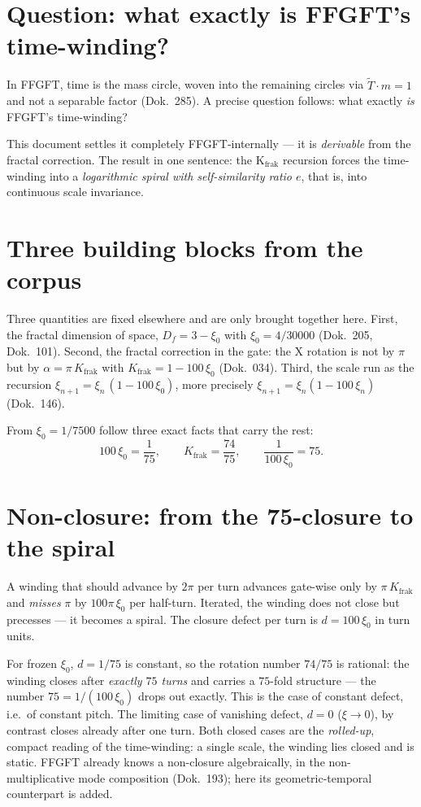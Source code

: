 \section{Question: what exactly is FFGFT's time-winding?}
In FFGFT, time is the mass circle, woven into the remaining circles via $\tilde T\cdot m=1$ and
not a separable factor (Dok.~285). A precise question follows: what exactly \emph{is} FFGFT's
time-winding?

This document settles it completely FFGFT-internally --- it is \emph{derivable} from the fractal
correction. The result in one sentence: the K$_{\text{frak}}$ recursion forces the time-winding
into a \emph{logarithmic spiral with self-similarity ratio $e$}, that is, into continuous scale
invariance.

\section{Three building blocks from the corpus}
Three quantities are fixed elsewhere and are only brought together here. First, the fractal
dimension of space, $D_f=3-\xi_0$ with $\xi_0=4/30000$ (Dok.~205, Dok.~101). Second, the fractal
correction in the gate: the X rotation is not by $\pi$ but by $\alpha=\pi\,K_{\text{frak}}$ with
$K_{\text{frak}}=1-100\,\xi_0$ (Dok.~034). Third, the scale run as the recursion
$\xi_{n+1}=\xi_n\,(1-100\,\xi_0)$, more precisely $\xi_{n+1}=\xi_n(1-100\,\xi_n)$ (Dok.~146).

From $\xi_0=1/7500$ follow three exact facts that carry the rest:
\begin{equation}
  100\,\xi_0=\frac{1}{75},\qquad K_{\text{frak}}=\frac{74}{75},\qquad
  \frac{1}{100\,\xi_0}=75 .
\end{equation}

\section{Non-closure: from the 75-closure to the spiral}
A winding that should advance by $2\pi$ per turn advances gate-wise only by
$\pi\,K_{\text{frak}}$ and \emph{misses} $\pi$ by $100\pi\,\xi_0$ per half-turn. Iterated, the
winding does not close but precesses --- it becomes a spiral. The closure defect per turn is
$d=100\,\xi_0$ in turn units.

For frozen $\xi_0$, $d=1/75$ is constant, so the rotation number $74/75$ is rational: the winding
closes after \emph{exactly $75$ turns} and carries a $75$-fold structure --- the number
$75=1/(100\,\xi_0)$ drops out exactly. This is the case of constant defect, i.e.\ of constant
pitch. The limiting case of vanishing defect, $d=0$ ($\xi\to0$), by contrast closes already
after one turn. Both closed cases are the
\emph{rolled-up}, compact reading of the time-winding: a single scale, the winding lies closed
and is static. FFGFT already knows a non-closure
algebraically, in the non-multiplicative mode composition (Dok.~193); here its
geometric-temporal counterpart is added.

